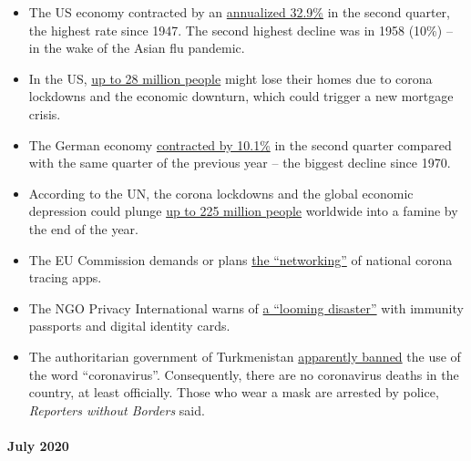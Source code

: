 \begin{itemize}
\tightlist
\item
  The US economy contracted by an
  \href{https://www.axios.com/us-gdp-q2-coronavirus-contraction-worst-ever-ed533bbf-1113-47fa-aee2-6e66fb553977.html}{annualized
  32.9\%} in the second quarter, the highest rate since 1947. The second
  highest decline was in 1958 (10\%) -- in the wake of the Asian flu
  pandemic.
\item
  In the US,
  \href{https://www.cnbc.com/2020/07/10/looming-evictions-may-soon-make-28-million-homeless-expert-says.html}{up
  to 28 million people} might lose their homes due to corona lockdowns
  and the economic downturn, which could trigger a new mortgage crisis.
\item
  The German economy
  \href{https://www.marketwatch.com/story/german-gdp-slumps-by-most-since-1970-in-the-second-quarter-11596096434}{contracted
  by 10.1\%} in the second quarter compared with the same quarter of the
  previous year -- the biggest decline since 1970.
\item
  According to the UN, the corona lockdowns and the global economic
  depression could plunge
  \href{https://www.telegraph.co.uk/global-health/climate-and-people/coronavirus-set-trigger-brutal-tragedies-fragile-countries-un/}{up
  to 225 million people} worldwide into a famine by the end of the year.
\item
  The EU Commission demands or plans
  \href{https://corona-transition.org/eu-kommission-will-alle-nationalen-corona-warn-apps-vernetzen}{the
  ``networking''} of national corona tracing apps.
\item
  The NGO Privacy International warns of
  \href{https://privacyinternational.org/long-read/4074/looming-disaster-immunity-passports-and-digital-identity}{a
  ``looming disaster''} with immunity passports and digital identity
  cards.
\item
  The authoritarian government of Turkmenistan
  \href{https://www.npr.org/sections/coronavirus-live-updates/2020/03/31/824611607/turkmenistan-has-banned-use-of-the-word-coronavirus}{apparently
  banned} the use of the word ``coronavirus''. Consequently, there are
  no coronavirus deaths in the country, at least officially. Those who
  wear a mask are arrested by police, \emph{Reporters without Borders}
  said.
\end{itemize}

\hypertarget{july-2020}{%
\paragraph{July 2020}\label{july-2020}}

